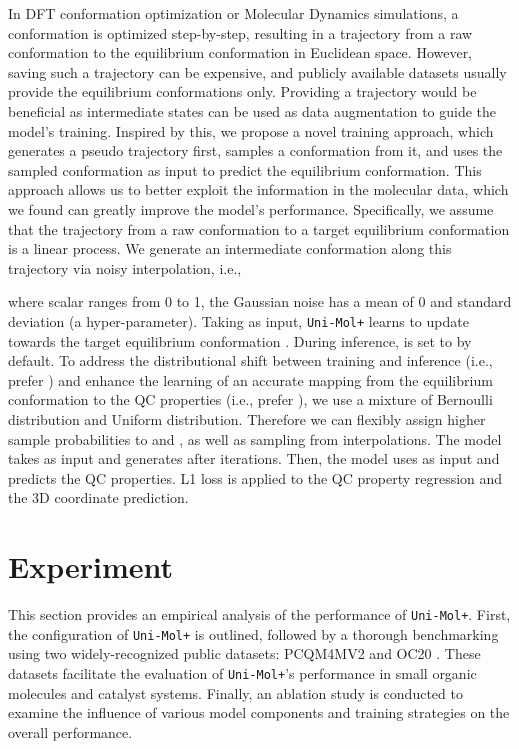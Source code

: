 \documentclass{article}
\newcommand{\name}{\texttt{Uni-Mol+}\xspace}
\begin{document}
In DFT conformation optimization or Molecular Dynamics simulations, a conformation is optimized step-by-step, resulting in a trajectory from a raw conformation to the equilibrium conformation in Euclidean space. However, saving such a trajectory can be expensive, and publicly available datasets usually provide the equilibrium conformations only. Providing a trajectory would be beneficial as intermediate states can be used as data augmentation to guide the model's training. Inspired by this, we propose a novel training approach, which generates a pseudo trajectory first,  samples a conformation from it, and uses the sampled conformation as input to predict the equilibrium conformation. This approach allows us to better exploit the information in the molecular data, which we found can greatly improve the model's performance. Specifically, we assume that the trajectory from a raw conformation  to a target equilibrium conformation  is a linear process. We generate an intermediate conformation along this trajectory via noisy interpolation, i.e.,

where scalar  ranges from 0 to 1, the Gaussian noise  has a mean of 0 and standard deviation  (a hyper-parameter). Taking  as input, \name learns to update towards the target equilibrium conformation . During inference,  is set to  by default. To address the distributional shift between training and inference (i.e., prefer ) and enhance the learning of an accurate mapping from the equilibrium conformation to the QC properties (i.e., prefer ), we use a mixture of Bernoulli distribution and Uniform distribution. Therefore we can flexibly assign higher sample probabilities to  and , as well as sampling from interpolations. The model takes  as input and generates  after  iterations. Then, the model uses  as input and predicts the QC properties. L1 loss is applied to the QC property regression and the 3D coordinate prediction. 


\section{Experiment}

This section provides an empirical analysis of the performance of \name. First, the configuration of \name is outlined, followed by a thorough benchmarking using two widely-recognized public datasets: PCQM4MV2 \cite{DBLP:conf/nips/HuFRNDL21} and OC20 \cite{chanussot2021open}. These datasets facilitate the evaluation of \name's performance in small organic molecules and catalyst systems. Finally, an ablation study is conducted to examine the influence of various model components and training strategies on the overall performance.
\end{document}
